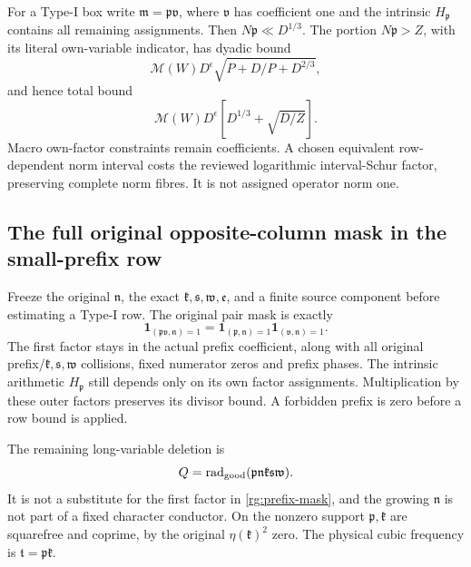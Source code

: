 For a Type-I box write \(\mathfrak m=\mathfrak p\mathfrak v\),
where \(\mathfrak v\) has coefficient one and the intrinsic
\(H_{\mathfrak p}\) contains all remaining assignments.
Then \(N\mathfrak p\ll D^{1/3}\).
The portion \(N\mathfrak p>Z\), with its literal own-variable
indicator, has dyadic bound
\[
 \mathcal M(W)D^\epsilon
       \sqrt{P+D/P+D^{2/3}},
\]
and hence total bound
\begin{equation}\label{rg:large-prefix}
 \mathcal M(W)D^\epsilon
                           [D^{1/3}+\sqrt{D/Z}].
\end{equation}
Macro own-factor constraints remain coefficients.
A chosen equivalent row-dependent norm interval costs the reviewed
logarithmic interval-Schur factor, preserving complete norm fibres.
It is not assigned operator norm one.

\subsection{The full original opposite-column mask in the small-prefix row}
\label{rg:deletion-proof}
Freeze the original \(\mathfrak n\), the exact
\(\mathfrak k,\mathfrak s,\mathfrak w,\mathfrak e\), and a finite
source component before estimating a Type-I row.
The original pair mask is exactly
\begin{equation}\label{rg:prefix-mask}
 \mathbf1_{(\mathfrak p\mathfrak v,\mathfrak n)=1}
 =\mathbf1_{(\mathfrak p,\mathfrak n)=1}
                 \mathbf1_{(\mathfrak v,\mathfrak n)=1}.
\end{equation}
The first factor stays in the actual prefix coefficient, along with
all original prefix/\(\mathfrak k,\mathfrak s,\mathfrak w\) collisions,
fixed numerator zeros and prefix phases.
The intrinsic arithmetic \(H_{\mathfrak p}\) still depends only on
its own factor assignments. Multiplication by these outer factors
preserves its divisor bound. A forbidden prefix is zero before
a row bound is applied.

The remaining long-variable deletion is
\[
 Q=\operatorname{rad}_{\rm good}
    (\mathfrak p\mathfrak n\mathfrak k\mathfrak s\mathfrak w).
\]
It is not a substitute for the first factor in
\eqref{rg:prefix-mask}, and the growing \(\mathfrak n\) is not
part of a fixed character conductor.
On the nonzero support \(\mathfrak p,\mathfrak k\) are squarefree
and coprime, by the original \(\eta(\mathfrak k)^2\) zero.
The physical cubic frequency is \(\mathfrak t=\mathfrak p\mathfrak k\).

